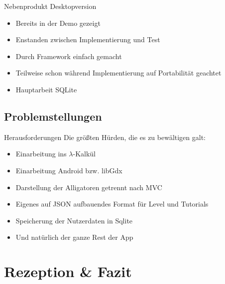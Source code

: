 \documentclass[18pt]{beamer}
\begin{document}
	\begin{frame}[<+->]{Nebenprodukt Desktopversion}
		\begin{itemize}
			\item Bereits in der Demo gezeigt
			\item Enstanden zwischen Implementierung und Test
			\item Durch Framework einfach gemacht
			\item Teilweise schon während Implementierung auf Portabilität geachtet
			\item Hauptarbeit SQLite
		\end{itemize}
	\end{frame}

	\subsection{Problemstellungen}
	\begin{frame}[<+->]{Herausforderungen}
		Die größten Hürden, die es zu bewältigen galt: 
		\begin{itemize}
			\item Einarbeitung ins $\lambda$-Kalkül
			\item Einarbeitung Android bzw. libGdx
			\item Darstellung der Alligatoren getrennt nach MVC
			\item Eigenes auf JSON aufbauendes Format für Level und Tutorials
			\item Speicherung der Nutzerdaten in Sqlite
			\item Und natürlich der ganze Rest der App
		\end{itemize}
	\end{frame}


\section{Rezeption \& Fazit}
\end{document}
